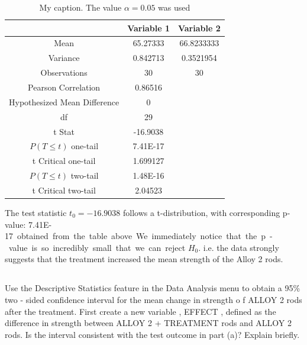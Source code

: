 \documentclass[letterpaper]{article}
\begin{document}
\begin{table}[H]
 \centering
 \begin{tabular}{c|c|c|}
                               & Variable 1 & Variable 2 \\ \hline
  Mean                         & 65.27333   & 66.8233333 \\ \hline
  Variance                     & 0.842713   & 0.3521954  \\ \hline
  Observations                 & 30         & 30         \\ \hline
  Pearson Correlation          & 0.86516    &            \\ \hline
  Hypothesized Mean Difference & 0          &            \\ \hline
  df                           & 29         &            \\ \hline
  t Stat                       & -16.9038   &            \\ \hline
  $P(T \leq t)$ one-tail       & 7.41E-17   &            \\ \hline
  t Critical one-tail          & 1.699127   &            \\ \hline
  $P(T \leq t)$ two-tail       & 1.48E-16   &            \\ \hline
  t Critical two-tail          & 2.04523    &            \\ \hline
 \end{tabular}
 \caption{My caption. The value $\alpha=0.05$ was used}
 \label{my-label}
\end{table}

The test statistic $t_0 = -16.9038$ follows a t-distribution, with
corresponding p-value: \SI{7.41E-17} obtained from the table above.

We immediately notice that the p-value is so incredibly small that we
can reject $H_0$. i.e. the data strongly suggests that the treatment
increased the mean strength of the Alloy 2 rods.

\subsection{}%
Use the  Descriptive Statistics feature in  the  Data Analysis menu to obtain a
95\%  two - sided  confidence interval for the mean change in strength o f ALLOY
2 rods after the treatment.   First create a new variable , EFFECT , defined as
the difference in strength between ALLOY 2 + TREATMENT rods and ALLOY 2 rods. Is
the interval consistent with the  test  outcome in part  (a)? Explain briefly.
\end{document}
